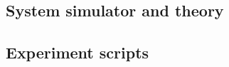 \documentclass[11pt,a4paper]{article}
\begin{document}
\subsection*{System simulator and theory}




\subsection*{Experiment scripts}


\end{document}
